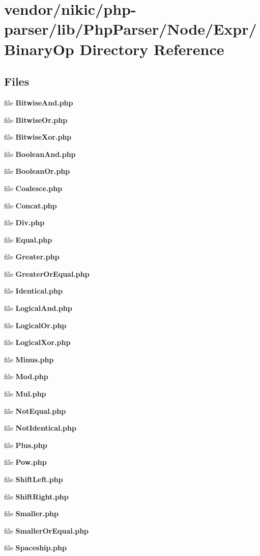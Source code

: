 \section{vendor/nikic/php-\/parser/lib/\+Php\+Parser/\+Node/\+Expr/\+Binary\+Op Directory Reference}
\label{dir_a26a30201f99aeef51b0552af34845b7}
\subsection*{Files}
\begin{DoxyCompactItemize}
\item 
file {\bf Bitwise\+And.\+php}
\item 
file {\bf Bitwise\+Or.\+php}
\item 
file {\bf Bitwise\+Xor.\+php}
\item 
file {\bf Boolean\+And.\+php}
\item 
file {\bf Boolean\+Or.\+php}
\item 
file {\bf Coalesce.\+php}
\item 
file {\bf Concat.\+php}
\item 
file {\bf Div.\+php}
\item 
file {\bf Equal.\+php}
\item 
file {\bf Greater.\+php}
\item 
file {\bf Greater\+Or\+Equal.\+php}
\item 
file {\bf Identical.\+php}
\item 
file {\bf Logical\+And.\+php}
\item 
file {\bf Logical\+Or.\+php}
\item 
file {\bf Logical\+Xor.\+php}
\item 
file {\bf Minus.\+php}
\item 
file {\bf Mod.\+php}
\item 
file {\bf Mul.\+php}
\item 
file {\bf Not\+Equal.\+php}
\item 
file {\bf Not\+Identical.\+php}
\item 
file {\bf Plus.\+php}
\item 
file {\bf Pow.\+php}
\item 
file {\bf Shift\+Left.\+php}
\item 
file {\bf Shift\+Right.\+php}
\item 
file {\bf Smaller.\+php}
\item 
file {\bf Smaller\+Or\+Equal.\+php}
\item 
file {\bf Spaceship.\+php}
\end{DoxyCompactItemize}
